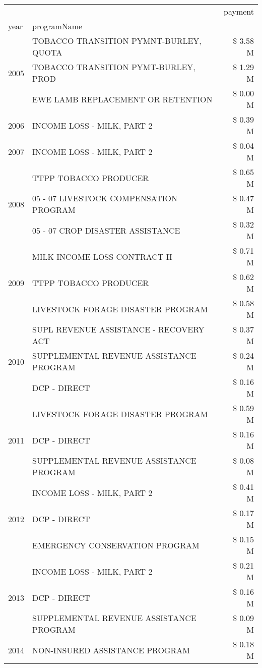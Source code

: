 \begin{tabular}{llr}
\toprule
 &  & payment \\
year & programName &  \\
\midrule
\multirow[t]{3}{*}{2005} & TOBACCO TRANSITION PYMNT-BURLEY, QUOTA & \$ 3.58 M \\
 & TOBACCO TRANSITION PYMT-BURLEY, PROD & \$ 1.29 M \\
 & EWE LAMB REPLACEMENT OR RETENTION & \$ 0.00 M \\
\cline{1-3}
2006 & INCOME LOSS - MILK, PART 2 & \$ 0.39 M \\
\cline{1-3}
2007 & INCOME LOSS - MILK, PART 2 & \$ 0.04 M \\
\cline{1-3}
\multirow[t]{3}{*}{2008} & TTPP TOBACCO PRODUCER & \$ 0.65 M \\
 & 05 - 07 LIVESTOCK COMPENSATION PROGRAM & \$ 0.47 M \\
 & 05 - 07 CROP DISASTER ASSISTANCE & \$ 0.32 M \\
\cline{1-3}
\multirow[t]{3}{*}{2009} & MILK INCOME LOSS CONTRACT II & \$ 0.71 M \\
 & TTPP TOBACCO PRODUCER & \$ 0.62 M \\
 & LIVESTOCK FORAGE DISASTER  PROGRAM & \$ 0.58 M \\
\cline{1-3}
\multirow[t]{3}{*}{2010} & SUPL REVENUE ASSISTANCE - RECOVERY ACT & \$ 0.37 M \\
 & SUPPLEMENTAL REVENUE ASSISTANCE PROGRAM & \$ 0.24 M \\
 & DCP - DIRECT & \$ 0.16 M \\
\cline{1-3}
\multirow[t]{3}{*}{2011} & LIVESTOCK FORAGE DISASTER PROGRAM & \$ 0.59 M \\
 & DCP - DIRECT & \$ 0.16 M \\
 & SUPPLEMENTAL REVENUE ASSISTANCE PROGRAM & \$ 0.08 M \\
\cline{1-3}
\multirow[t]{3}{*}{2012} & INCOME LOSS - MILK, PART 2 & \$ 0.41 M \\
 & DCP - DIRECT & \$ 0.17 M \\
 & EMERGENCY CONSERVATION PROGRAM & \$ 0.15 M \\
\cline{1-3}
\multirow[t]{3}{*}{2013} & INCOME LOSS - MILK, PART 2 & \$ 0.21 M \\
 & DCP - DIRECT & \$ 0.16 M \\
 & SUPPLEMENTAL REVENUE ASSISTANCE PROGRAM & \$ 0.09 M \\
\cline{1-3}
\multirow[t]{3}{*}{2014} & NON-INSURED ASSISTANCE PROGRAM & \$ 0.18 M \\

\end{tabular}

